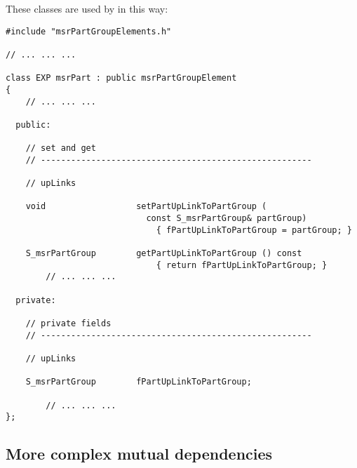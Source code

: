 These classes are used by  in  this way:
\begin{lstlisting}[language=CPlusPlus]
#include "msrPartGroupElements.h"

// ... ... ...

class EXP msrPart : public msrPartGroupElement
{
	// ... ... ...

  public:

    // set and get
    // ------------------------------------------------------

    // upLinks

    void                  setPartUpLinkToPartGroup (
                            const S_msrPartGroup& partGroup)
                              { fPartUpLinkToPartGroup = partGroup; }

    S_msrPartGroup        getPartUpLinkToPartGroup () const
                              { return fPartUpLinkToPartGroup; }
		// ... ... ...

  private:

    // private fields
    // ------------------------------------------------------

    // upLinks

    S_msrPartGroup        fPartUpLinkToPartGroup;

		// ... ... ...
};
\end{lstlisting}


\subsection{More complex mutual dependencies}

